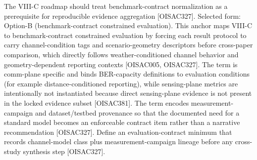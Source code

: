  The VIII-C roadmap should treat benchmark-contract normalization as a prerequisite for reproducible evidence aggregation [O\markdownRendererUnderscore{}ISAC\markdownRendererUnderscore{}327].\markdownRendererOlItemEnd 
\markdownRendererOlEnd \markdownRendererInterblockSeparator
{}
\markdownRendererSectionEnd \markdownRendererSectionBegin
{}\markdownRendererInterblockSeparator
{}Selected form: Option-B (benchmark-contract constrained evaluation).\markdownRendererParagraphSeparator
{}\markdownRendererSoftLineBreak
{}\markdownRendererParagraphSeparator
{}This anchor maps VIII-C to benchmark-contract constrained evaluation by forcing each result protocol to carry channel-condition tags and scenario-geometry descriptors before cross-paper comparison, which directly follows weather-conditioned channel behavior and geometry-dependent reporting contexts [O\markdownRendererUnderscore{}ISAC\markdownRendererUnderscore{}005, O\markdownRendererUnderscore{}ISAC\markdownRendererUnderscore{}327]. The term  is comm-plane specific and binds BER-capacity definitions to evaluation conditions (for example distance-conditioned reporting), while sensing-plane metrics are intentionally not instantiated because direct sensing-plane evidence is not present in the locked evidence subset [O\markdownRendererUnderscore{}ISAC\markdownRendererUnderscore{}381]. The term  encodes measurement-campaign and dataset/testbed provenance so that the documented need for a standard model becomes an enforceable contract item rather than a narrative recommendation [O\markdownRendererUnderscore{}ISAC\markdownRendererUnderscore{}327].\markdownRendererInterblockSeparator
{}
\markdownRendererSectionEnd \markdownRendererSectionBegin
{}\markdownRendererInterblockSeparator
{}\markdownRendererUlBeginTight
\markdownRendererUlItem Define an evaluation-contract minimum that records channel-model class plus measurement-campaign lineage before any cross-study synthesis step [O\markdownRendererUnderscore{}ISAC\markdownRendererUnderscore{}327].\markdownRendererUlItemEnd 
